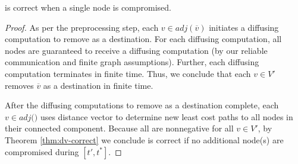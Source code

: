 \begin{corollary}
\label{cor:second-correct-single}
\second is correct when a single node is compromised.
\end{corollary}
\begin{proof}
As per the preprocessing step, each $v \in adj(\overline{v})$ initiates a diffusing computation to remove \bad as a destination. For each diffusing computation,
all nodes are guaranteed to receive a diffusing computation (by our reliable communication and finite graph assumptions). Further, each diffusing computation
terminates in finite time.  Thus, we conclude that each $v \in V'$ removes $\overline{v}$ as a destination in finite time.

After the diffusing computations to remove \bad as a destination complete, each 
$v \in adj($\bads$)$ uses distance vector to determine new least cost paths to all nodes in their connected component.
Because all \dmatrixv are nonnegative for all $v \in V'$, by Theorem \ref{thm:dv-correct} we conclude \second is correct if no additional node(s) are compromised
during $[t',t^*]$. %
\end{proof}

